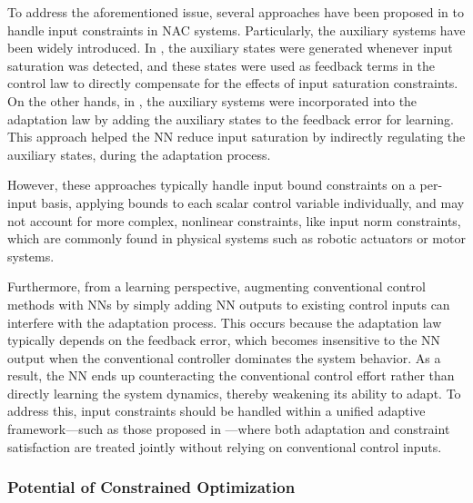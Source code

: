 \documentclass[letterpaper, journal]{IEEEtran}
\begin{document}
To address the aforementioned issue, several approaches have been proposed in \cite{Gao:2006aa,Arefinia:2020aa,He:2016aa,Peng:2020aa,Esfandiari:2014aa,Karason:1994aa,Esfandiari:2015aa} to handle input constraints in NAC systems.
Particularly, the auxiliary systems have been widely introduced.
In \cite{Arefinia:2020aa,He:2016aa,Peng:2020aa}, the auxiliary states were generated whenever input saturation was detected, and these states were used as feedback terms in the control law to directly compensate for the effects of input saturation constraints.
On the other hands, in \cite{Esfandiari:2014aa,Karason:1994aa,Esfandiari:2015aa}, the auxiliary systems were incorporated into the adaptation law by adding the auxiliary states to the feedback error for learning.
This approach helped the NN reduce input saturation by indirectly regulating the auxiliary states, during the adaptation process.

However, these approaches typically handle input bound constraints on a per-input basis, \ie applying bounds to each scalar control variable individually, and may not account for more complex, nonlinear constraints, like input norm constraints, which are commonly found in physical systems such as robotic actuators or motor systems.

Furthermore, from a learning perspective, augmenting conventional control methods with NNs by simply adding NN outputs to existing control inputs can interfere with the adaptation process. 
This occurs because the adaptation law typically depends on the feedback error, which becomes insensitive to the NN output when the conventional controller dominates the system behavior. 
As a result, the NN ends up counteracting the conventional control effort rather than directly learning the system dynamics, thereby weakening its ability to adapt.
To address this, input constraints should be handled within a unified adaptive framework—such as those proposed in \cite{Esfandiari:2014aa,Karason:1994aa,Esfandiari:2015aa}—where both adaptation and constraint satisfaction are treated jointly without relying on conventional control inputs.

\hfill

\subsubsection{Potential of Constrained Optimization}
\end{document}
